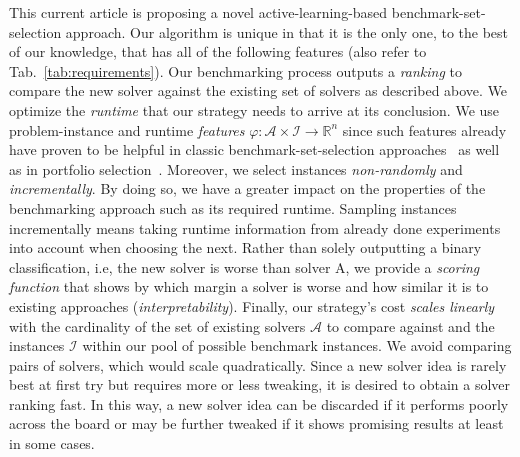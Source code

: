 \documentclass[runningheads]{llncs}
\begin{document}
This current article is proposing a novel active-learning-based benchmark-set-selection approach.
Our algorithm is unique in that it is the only one, to the best of our knowledge, that has all of the following features (also refer to Tab.~\ref{tab:requirements}).
Our benchmarking process outputs a \emph{ranking} to compare the new solver against the existing set of solvers as described above.
We optimize the \emph{runtime} that our strategy needs to arrive at its conclusion.
We use problem-instance and runtime \emph{features} $\varphi\!: \mathcal{A} \times \mathcal{I} \rightarrow \mathbb{R}^n$ since such features already have proven to be helpful in classic benchmark-set-selection approaches~\cite{HoosKSS13} as well as in portfolio selection~\cite{CollauttiMMO13,NgokoCT19}.
Moreover, we select instances \emph{non-randomly} and \emph{incrementally}.
By doing so, we have a greater impact on the properties of the benchmarking approach such as its required runtime.
Sampling instances incrementally means taking runtime information from already done experiments into account when choosing the next.
Rather than solely outputting a binary classification, i.e, the new solver is worse than solver A, we provide a \emph{scoring function} that shows by which margin a solver is worse and how similar it is to existing approaches (\emph{interpretability}).
Finally, our strategy's cost \emph{scales linearly} with the cardinality of the set of existing solvers $\mathcal{A}$ to compare against and the instances $\mathcal{I}$ within our pool of possible benchmark instances.
We avoid comparing pairs of solvers, which would scale quadratically.
Since a new solver idea is rarely best at first try but requires more or less tweaking, it is desired to obtain a solver ranking fast.
In this way, a new solver idea can be discarded if it performs poorly across the board or may be further tweaked if it shows promising results at least in some cases.
\end{document}
